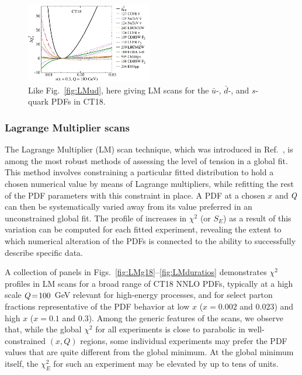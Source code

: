 \begin{figure}[p]
	\includegraphics[width=0.49\textwidth]{./fig/LM/s_hx.pdf} %
	\caption{
		Like Fig.~\ref{fig:LMud}, here giving LM scans for the
		$\bar{u}$-, $\bar{d}$-, and $s$-quark PDFs
		in CT18.
		}
\label{fig:LMubdbs}
\end{figure}

\subsubsection{Lagrange Multiplier scans
\label{sec:LMScans}
}

The Lagrange Multiplier (LM) scan technique,
which was introduced in Ref.~\cite{Stump:2001gu}, is among the most
robust methods of assessing the level of tension in a global fit. This method involves constraining a particular fitted distribution
to hold a chosen numerical value by means of Lagrange multipliers,
while refitting the rest of the PDF parameters with this constraint
in place. A PDF at a chosen $x$ and $Q$ can then be systematically varied away from its value preferred in an unconstrained global fit. The profile of increases in $\chi^2$ (or $S_E$) as a result of this variation can be computed for each fitted experiment, revealing the extent to which numerical alteration
of the PDFs is connected to the ability to successfully describe specific data.
%

 A collection of panels
in Figs.~\ref{fig:LMg18}--\ref{fig:LMduratios}
demonstrates $\chi^2$ profiles in LM scans
for a broad range of CT18 NNLO PDFs, typically at a high scale $Q\!=\! 100$ GeV relevant for high-energy processes,
and for select parton fractions representative of the PDF
behavior at low $x$ ($x=0.002$ and $0.023$) and high $x$ ($x=0.1$ and
$0.3$). Among the generic features of the scans, we observe that,
while the global $\chi^2$ for all experiments is close to parabolic in
well-constrained $(x,Q)$ regions, some individual experiments may
prefer the PDF values that are quite different from the global
minimum. At the global minimum itself, the $\chi^2_E$ for such an
experiment may be elevated by up to tens of units.  

